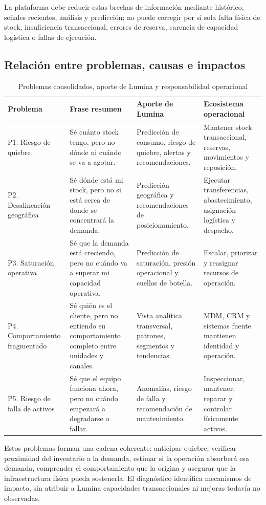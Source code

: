\documentclass[11pt,a4paper]{article}
\begin{document}
La plataforma debe reducir estas brechas de información mediante histórico, señales recientes, análisis y predicción; no puede corregir por sí sola falta física de stock, insuficiencia transaccional, errores de reserva, carencia de capacidad logística o fallas de ejecución.
\LuminaSilos

\subsection{Relación entre problemas, causas e impactos}
\begin{table}[H]
\caption{Problemas consolidados, aporte de Lumina y responsabilidad operacional}\label{tab:diagnostico}
\scriptsize
\begin{tabularx}{\linewidth}{@{}P{.18\linewidth}P{.24\linewidth}YY@{}}\toprule
Problema & Frase resumen & Aporte de Lumina & Ecosistema operacional\\\midrule
P1. Riesgo de quiebre & Sé cuánto stock tengo, pero no dónde ni cuándo se va a agotar. & Predicción de consumo, riesgo de quiebre, alertas y recomendaciones. & Mantener stock transaccional, reservas, movimientos y reposición.\\
P2. Desalineación geográfica & Sé dónde está mi stock, pero no si está cerca de donde se concentrará la demanda. & Predicción geográfica y recomendaciones de posicionamiento. & Ejecutar transferencias, abastecimiento, asignación logística y despacho.\\
P3. Saturación operativa & Sé que la demanda está creciendo, pero no cuándo va a superar mi capacidad operativa. & Predicción de saturación, presión operacional y cuellos de botella. & Escalar, priorizar y reasignar recursos de operación.\\
P4. Comportamiento fragmentado & Sé quién es el cliente, pero no entiendo su comportamiento completo entre unidades y canales. & Vista analítica transversal, patrones, segmentos y tendencias. & MDM, CRM y sistemas fuente mantienen identidad y operación.\\
P5. Riesgo de falla de activos & Sé que el equipo funciona ahora, pero no cuándo empezará a degradarse o fallar. & Anomalías, riesgo de falla y recomendación de mantenimiento. & Inspeccionar, mantener, reparar y controlar físicamente activos.\\\bottomrule
\end{tabularx}
\end{table}

Estos problemas forman una cadena coherente: anticipar quiebre, verificar proximidad del inventario a la demanda, estimar si la operación absorberá esa demanda, comprender el comportamiento que la origina y asegurar que la infraestructura física pueda sostenerla. El diagnóstico identifica mecanismos de impacto, sin atribuir a Lumina capacidades transaccionales ni mejoras todavía no observadas.
\end{document}
